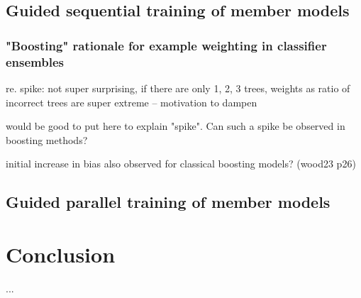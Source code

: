 \documentclass[
    a4paper, %
	fontsize=10pt, %
	twoside=false, %
]{kaobook}
\begin{document}
\section{Guided sequential training of member models}
\label{sec:dynamic-random-forests}





\subsection{"Boosting" rationale for example weighting in classifier ensembles}

re. spike: not super surprising, if there are only 1, 2, 3 trees, weights as ratio of incorrect trees are super extreme -- motivation to dampen

would be good to put here to explain "spike". Can such a spike be observed in boosting methods?

initial increase in bias also observed for classical boosting models? (wood23 p26)







\section{Guided parallel training of member models}






\chapter{Conclusion}
...

\end{document}
